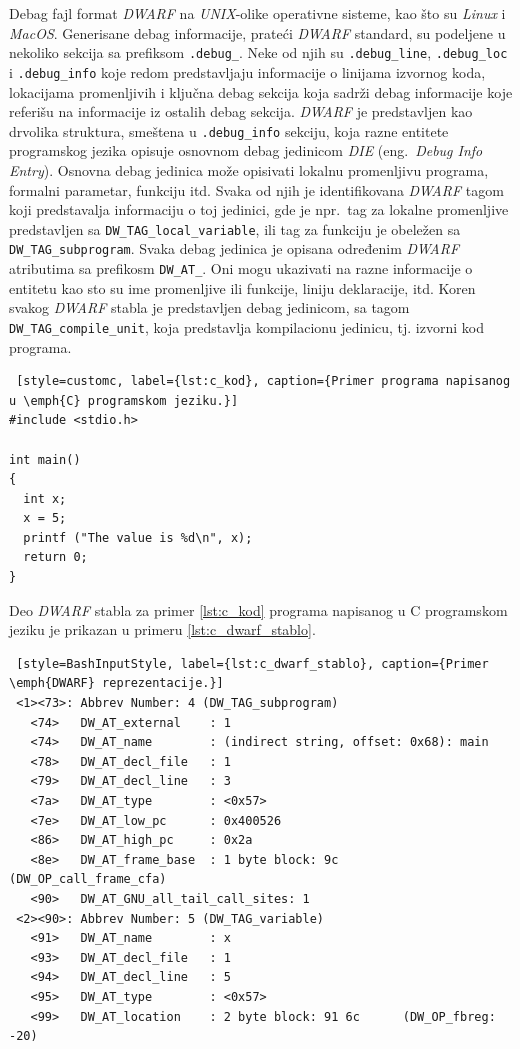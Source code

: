 \documentclass[12pt,oneside]{memoir}
\begin{document}
Debag fajl format \emph{DWARF} na \emph{UNIX}-olike operativne sisteme, kao što su \emph{Linux} i \emph{MacOS}. Generisane debag informacije, prateći \emph{DWARF} standard, su podeljene u nekoliko sekcija sa prefiksom \texttt{.debug\_}. Neke od njih su \texttt{.debug\_line}, \texttt{.debug\_loc} i \texttt{.debug\_info} koje redom predstavljaju informacije o linijama izvornog koda, lokacijama promenljivih i ključna debag sekcija koja sadrži debag informacije koje referišu na informacije iz ostalih debag sekcija.
\emph{DWARF} je predstavljen kao drvolika struktura, smeštena u \texttt{.debug\_info} sekciju,  koja razne entitete programskog jezika opisuje osnovnom debag jedinicom \emph{DIE} (eng.~\emph{Debug Info Entry}). Osnovna debag jedinica može opisivati lokalnu promenljivu programa, formalni parametar, funkciju itd. Svaka od njih je identifikovana \emph{DWARF} tagom koji predstavalja informaciju o toj jedinici, gde je npr.~tag za lokalne promenljive predstavljen sa \texttt{DW\_TAG\_local\_variable}, ili tag za funkciju je obeležen sa \texttt{DW\_TAG\_subprogram}. Svaka debag jedinica je opisana određenim \emph{DWARF} atributima sa prefikosm \texttt{DW\_AT\_}. Oni mogu ukazivati na razne informacije o entitetu kao sto su ime promenljive ili funkcije, liniju deklaracije, itd. Koren svakog \emph{DWARF} stabla je predstavljen debag jedinicom, sa tagom  \texttt{DW\_TAG\_compile\_unit}, koja predstavlja kompilacionu jedinicu, tj. izvorni kod programa.

\begin{lstlisting} [style=customc, label={lst:c_kod}, caption={Primer programa napisanog u \emph{C} programskom jeziku.}]
#include <stdio.h>

int main()
{
  int x;
  x = 5;
  printf ("The value is %d\n", x);
  return 0;
}
\end{lstlisting}

Deo \emph{DWARF} stabla za primer \ref{lst:c_kod} programa napisanog u C programskom jeziku je prikazan u primeru \ref{lst:c_dwarf_stablo}.

\begin{lstlisting} [style=BashInputStyle, label={lst:c_dwarf_stablo}, caption={Primer \emph{DWARF} reprezentacije.}]
 <1><73>: Abbrev Number: 4 (DW_TAG_subprogram)
   <74>   DW_AT_external    : 1
   <74>   DW_AT_name        : (indirect string, offset: 0x68): main
   <78>   DW_AT_decl_file   : 1
   <79>   DW_AT_decl_line   : 3
   <7a>   DW_AT_type        : <0x57>
   <7e>   DW_AT_low_pc      : 0x400526
   <86>   DW_AT_high_pc     : 0x2a
   <8e>   DW_AT_frame_base  : 1 byte block: 9c         (DW_OP_call_frame_cfa)
   <90>   DW_AT_GNU_all_tail_call_sites: 1
 <2><90>: Abbrev Number: 5 (DW_TAG_variable)
   <91>   DW_AT_name        : x
   <93>   DW_AT_decl_file   : 1
   <94>   DW_AT_decl_line   : 5
   <95>   DW_AT_type        : <0x57>
   <99>   DW_AT_location    : 2 byte block: 91 6c      (DW_OP_fbreg: -20)
\end{lstlisting}
\end{document}
